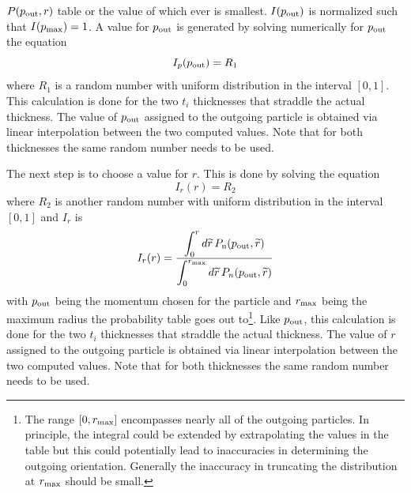 $P(p_{\text{out}}, r)$ table or the value of  which ever is smallest. $I(p_{\text{out}})$
is normalized such that $I(p_{\text{max}}) = 1$. A value for $p_{\text{out}}$ is generated by solving
numerically for $p_{\text{out}}$ the equation
\begin{equation}
  I_p(p_{\text{out}}) = R_1
\end{equation}
where $R_1$ is a random number with uniform distribution in the interval $[0,1]$.  This
calculation is done for the two $t_i$ thicknesses that straddle the actual thickness. The value of
$p_{\text{out}}$ assigned to the outgoing particle is obtained via linear interpolation between the two
computed values. Note that for both thicknesses the same random number needs to be used.

The next step is to choose a value for $r$. This is done by solving the equation
\begin{equation}
  I_r(r) = R_2
\end{equation}
where $R_2$ is another random number with uniform distribution in the interval $[0,1]$ and $I_r$ is 
\begin{equation}
  I_r(r) = \frac{\displaystyle \int_0^r d{\widetilde r} \, P_{\text{n}}(p_{\text{out}}, {\widetilde r})}
  {\displaystyle \int_0^{r_{\text{max}}} d{\widetilde r} \, P_{n}(p_{\text{out}}, {\widetilde r})}
\end{equation}
with $p_{\text{out}}$ being the momentum chosen for the particle and $r_{\text{max}}$ being the maximum
radius the probability table goes out to\footnote
  {
The range $[0,r_{\text{max}}]$ encompasses nearly all of the outgoing particles. In principle, the
integral could be extended by extrapolating the values in the table but this could potentially lead
to inaccuracies in determining the outgoing orientation. Generally the inaccuracy in truncating the
distribution at $r_{\text{max}}$ should be small.
  }. 
Like $p_{\text{out}}$, this calculation is done for the two
$t_i$ thicknesses that straddle the actual thickness. The value of $r$ assigned to the outgoing
particle is obtained via linear interpolation between the two computed values. Note that for both
thicknesses the same random number needs to be used.


